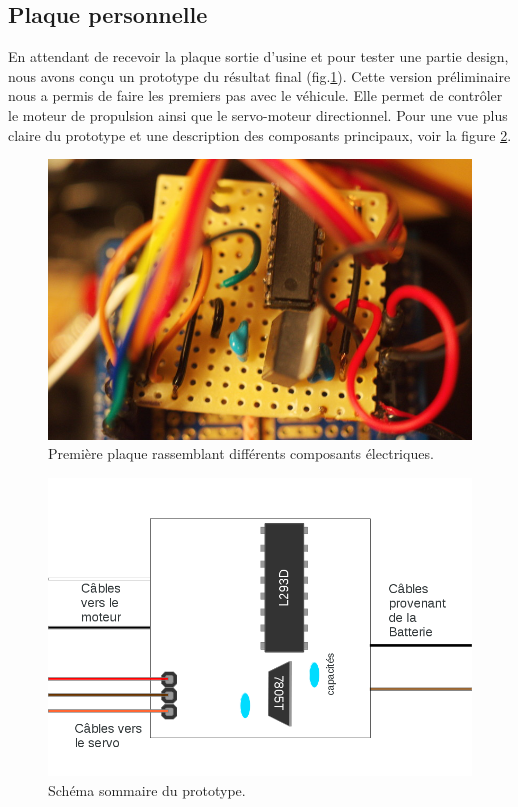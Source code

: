 \documentclass[a4paper,11pt]{report}
\begin{document}
{\begin{enumerate}
\begin{enumerate}
\subsection{Plaque personnelle}
En attendant de recevoir la plaque sortie d'usine et pour tester une partie
design, nous avons conçu un prototype du résultat final
(fig.\ref{PPFigure}). Cette version préliminaire nous a permis de faire les
premiers
pas avec le véhicule. Elle permet de contrôler le moteur de propulsion ainsi
que le servo-moteur directionnel.
Pour une vue plus claire du prototype et une description des composants
principaux, voir la figure \ref{SchemaPlaqueMaison}. 

\begin{figure}[h]
\centering
\includegraphics[width=1.0\textwidth]{DSC_1116res}
    \caption[Prototype du PCB]{\label{PPFigure}Première plaque rassemblant différents composants électriques. 
    }
\end{figure}
 
\begin{figure}[h]
\centering
\includegraphics[width=1.0\textwidth]{SchemaPlaqueMaison}
    \caption{\label{SchemaPlaqueMaison}Schéma sommaire du prototype.
    }
\end{figure}


\end{enumerate}
\end{enumerate}}
\end{document}

